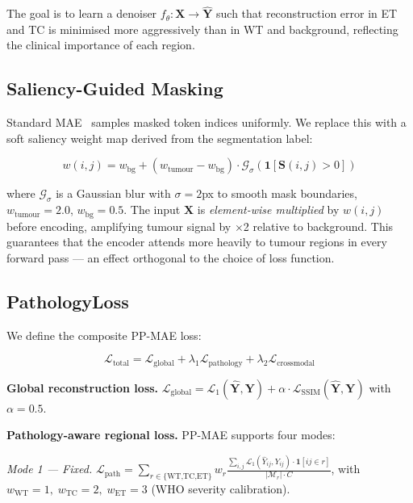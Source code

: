 \documentclass[runningheads]{llncs}
\begin{document}
The goal is to learn a denoiser $f_\theta: \mathbf{X} \rightarrow
\hat{\mathbf{Y}}$ such that reconstruction error in ET and TC is
minimised more aggressively than in WT and background, reflecting
the clinical importance of each region.

\subsection{Saliency-Guided Masking}
\label{subsec:masking}

Standard MAE~\cite{he2022mae} samples masked token indices uniformly.
We replace this with a soft saliency weight map derived from the
segmentation label:

\begin{equation}
w(i,j) = w_{\text{bg}} + (w_{\text{tumour}} - w_{\text{bg}}) \cdot
  \mathcal{G}_\sigma(\mathbf{1}[\mathbf{S}(i,j)>0])
\label{eq:saliency}
\end{equation}

where $\mathcal{G}_\sigma$ is a Gaussian blur with $\sigma=2$px to
smooth mask boundaries, $w_{\text{tumour}}=2.0$, $w_{\text{bg}}=0.5$.
The input $\mathbf{X}$ is \emph{element-wise multiplied} by $w(i,j)$
before encoding, amplifying tumour signal by $\times$2 relative to
background.
This guarantees that the encoder attends more heavily to tumour regions
in every forward pass — an effect orthogonal to the choice of loss function.

\subsection{PathologyLoss}
\label{subsec:pathloss}

We define the composite PP-MAE loss:

\begin{equation}
\mathcal{L}_{\text{total}} = \mathcal{L}_{\text{global}} +
  \lambda_1 \mathcal{L}_{\text{pathology}} +
  \lambda_2 \mathcal{L}_{\text{crossmodal}}
\label{eq:total}
\end{equation}

\textbf{Global reconstruction loss.}
$\mathcal{L}_{\text{global}} = \mathcal{L}_{1}(\hat{\mathbf{Y}}, \mathbf{Y})
 + \alpha \cdot \mathcal{L}_{\text{SSIM}}(\hat{\mathbf{Y}}, \mathbf{Y})$
with $\alpha=0.5$.

\textbf{Pathology-aware regional loss.} PP-MAE supports four modes:

\emph{Mode 1 — Fixed.}
$\mathcal{L}_{\text{path}} = \sum_{r \in \{\text{WT,TC,ET}\}} w_r
\frac{\sum_{i,j} \mathcal{L}_1(\hat{Y}_{ij}, Y_{ij}) \cdot \mathbf{1}[ij \in r]}
{|\mathcal{M}_r| \cdot C}$,
with $w_{\text{WT}}=1,\; w_{\text{TC}}=2,\; w_{\text{ET}}=3$
(WHO severity calibration).
\end{document}
